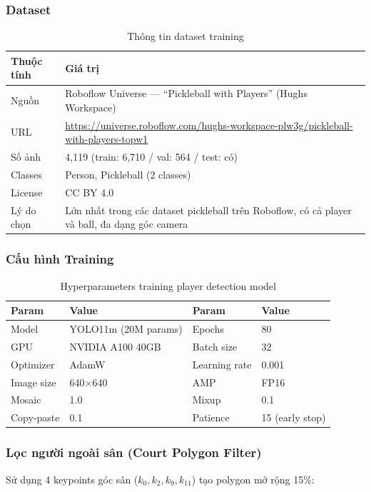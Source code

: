 \documentclass[12pt,a4paper]{article}
\begin{document}
\subsubsection{Dataset}
\begin{table}[H]
\centering
\caption{Thông tin dataset training}
\label{tab:dataset}
\begin{tabularx}{\textwidth}{l X}
\toprule
\textbf{Thuộc tính} & \textbf{Giá trị} \\
\midrule
Nguồn & Roboflow Universe --- ``Pickleball with Players'' (Hughs Workspace) \\
URL & \url{https://universe.roboflow.com/hughs-workspace-plw3g/pickleball-with-players-topw1} \\
Số ảnh & 4,119 (train: 6,710 / val: 564 / test: có) \\
Classes & Person, Pickleball (2 classes) \\
License & CC BY 4.0 \\
Lý do chọn & Lớn nhất trong các dataset pickleball trên Roboflow, có cả player và ball, đa dạng góc camera \\
\bottomrule
\end{tabularx}
\end{table}

\subsubsection{Cấu hình Training}
\begin{table}[H]
\centering
\caption{Hyperparameters training player detection model}
\label{tab:training}
\begin{tabular}{ll|ll}
\toprule
\textbf{Param} & \textbf{Value} & \textbf{Param} & \textbf{Value} \\
\midrule
Model & YOLO11m (20M params) & Epochs & 80 \\
GPU & NVIDIA A100 40GB & Batch size & 32 \\
Optimizer & AdamW & Learning rate & 0.001 \\
Image size & 640$\times$640 & AMP & FP16 \\
Mosaic & 1.0 & Mixup & 0.1 \\
Copy-paste & 0.1 & Patience & 15 (early stop) \\
\bottomrule
\end{tabular}
\end{table}

\subsubsection{Lọc người ngoài sân (Court Polygon Filter)}
Sử dụng 4 keypoints góc sân ($k_0, k_2, k_9, k_{11}$) tạo polygon mở rộng 15\%:
\end{document}
